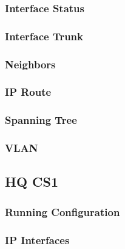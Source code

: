 \subsubsection{Interface Status}


\subsubsection{Interface Trunk}


\subsubsection{Neighbors}


\subsubsection{IP Route}


\subsubsection{Spanning Tree}


\subsubsection{VLAN}




\subsection{HQ CS1}
\subsubsection{Running Configuration}


\subsubsection{IP Interfaces}


